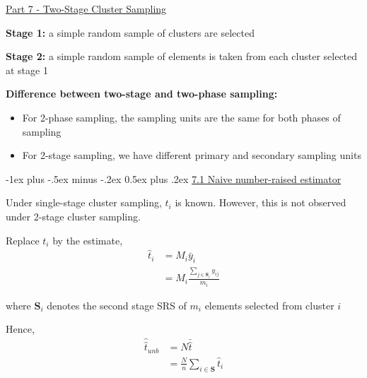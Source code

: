 \documentclass[10pt,landscape]{article}
\makeatletter
\renewcommand{\section}{\@startsection{section}{1}{0mm}%
                                {-1ex plus -.5ex minus -.2ex}%
                                {0.5ex plus .2ex}%
                                {\normalfont\large\bfseries}}
\makeatother
\begin{document}
\raggedright
\footnotesize
\begin{multicols}{3}


\setlength{\premulticols}{1pt}
\setlength{\postmulticols}{1pt}
\setlength{\multicolsep}{1pt}
\setlength{\columnsep}{2pt}

\begin{center}
     \Large{\underline{Part 7 - Two-Stage Cluster Sampling}} \\
\end{center}

\textbf{Stage 1:} a simple random sample of clusters are selected

\textbf{Stage 2:} a simple random sample of elements is taken from each cluster selected at stage 1

\vspace{5}

\textbf{Difference between two-stage and two-phase sampling:}
\begin{itemize}
  \item For 2-phase sampling, the sampling units are the same for both phases of sampling
  \item For 2-stage sampling, we have different primary and secondary sampling units
\end{itemize}

\section{\underline{7.1 Naive number-raised estimator}}

Under single-stage cluster sampling, $t_{i}$ is known. However, this is not observed under 2-stage cluster sampling.

\vspace{5}

Replace $t_{i}$ by the estimate,
\begin{equation}
  \begin{split}
    \hat{t}_{i} &= M_{i}\bar{y}_{i} \\
    &= M_{i}\frac{\sum_{j \in \textbf{S}_{i}} y_{ij}}{m_{i}}
  \end{split}
\end{equation}

where $\textbf{S}_{i}$ denotes the second stage SRS of $m_{i}$ elements selected from cluster $i$

Hence,
\begin{equation}
  \begin{split}
    \hat{\hat{t}}_{unb} &= N\bar{\hat{t}} \\
    &= \frac{N}{n}\sum_{i \in \textbf{S}}\hat{t}_{i}
  \end{split}
\end{equation}


\end{multicols}
\end{document}
